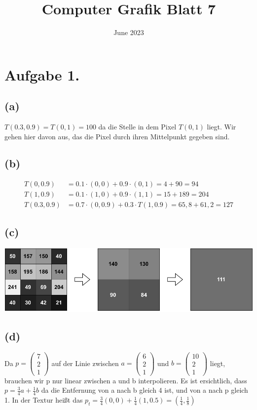 \documentclass{article}
\title{Computer Grafik Blatt 7}
\date{June 2023}
\begin{document}
\maketitle

\section*{Aufgabe 1.}

\subsection*{(a)}

$T(0.3,0.9)= T(0,1) = 100$ da die Stelle in dem Pixel $T(0,1)$ liegt. Wir gehen hier davon aus, das die Pixel durch ihren Mittelpunkt gegeben sind.


\subsection*{(b)}

\begin{align*}
    T(0,0.9) &= 0.1\cdot(0,0) + 0.9\cdot(0,1) = 4 + 90 = 94\\
    T(1,0.9) &= 0.1\cdot(1,0) + 0.9\cdot(1,1) = 15 + 189 = 204\\
    T(0.3,0.9) &= 0.7\cdot(0,0.9) + 0.3\cdot T(1,0.9) = 65,8 + 61,2 = 127
\end{align*}

\subsection*{(c)}

\includegraphics[width = \textwidth, keepaspectratio]{CG7.1.c.drawio.pdf}

\subsection*{(d)}
Da  $p = 
\begin{pmatrix}
7\\2\\1
\end{pmatrix}$
 auf der Linie zwischen $a =
\begin{pmatrix}
6\\2\\1
\end{pmatrix}$
 und $b =
\begin{pmatrix}
10\\2\\1
\end{pmatrix}$
 liegt, brauchen wir p nur linear zwischen a und b interpolieren. Es ist ersichtlich, dass $p = \frac{3}{4}a+\frac{1}{4}b$ da die Entfernung von a nach b gleich 4 ist, und von a nach p gleich 1.
 In der Textur heißt das $p_{t}=\frac{3}{4}(0,0)+\frac{1}{4}(1,0.5)=(\frac{1}{4},\frac{1}{8}) $
\end{document}
